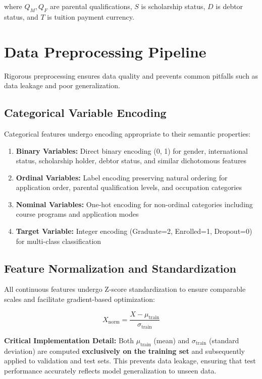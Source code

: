 where $Q_M, Q_F$ are parental qualifications, $S$ is scholarship status, $D$ is debtor status, and $T$ is tuition payment currency.

\section{Data Preprocessing Pipeline}

Rigorous preprocessing ensures data quality and prevents common pitfalls such as data leakage and poor generalization.

\subsection{Categorical Variable Encoding}

Categorical features undergo encoding appropriate to their semantic properties:

\begin{enumerate}
\item \textbf{Binary Variables:} Direct binary encoding (0, 1) for gender, international status, scholarship holder, debtor status, and similar dichotomous features
\item \textbf{Ordinal Variables:} Label encoding preserving natural ordering for application order, parental qualification levels, and occupation categories
\item \textbf{Nominal Variables:} One-hot encoding for non-ordinal categories including course programs and application modes
\item \textbf{Target Variable:} Integer encoding (Graduate=2, Enrolled=1, Dropout=0) for multi-class classification
\end{enumerate}

\subsection{Feature Normalization and Standardization}

All continuous features undergo Z-score standardization to ensure comparable scales and facilitate gradient-based optimization:

\begin{equation}
X_{\text{norm}} = \frac{X - \mu_{\text{train}}}{\sigma_{\text{train}}}
\end{equation}

\textbf{Critical Implementation Detail:} Both $\mu_{\text{train}}$ (mean) and $\sigma_{\text{train}}$ (standard deviation) are computed \textbf{exclusively on the training set} and subsequently applied to validation and test sets. This prevents data leakage, ensuring that test performance accurately reflects model generalization to unseen data.


